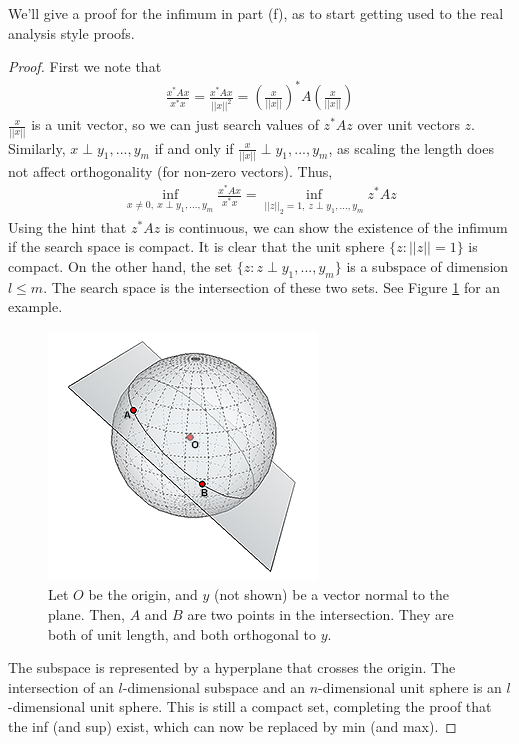 \documentclass[11pt]{article}
\theoremstyle{plain}
\theoremstyle{definition}
\theoremstyle{remark}
\begin{document}
We'll give a proof for the infimum in part (f), as to start getting used to the real analysis style proofs. 
\begin{proof}
First we note that
\begin{align*}
    \frac{x^* A x}{x^*x} = \frac{x^* A x}{||x||^2} = \left(\frac{x}{||x||}\right)^* A \left(\frac{x}{||x||}\right)
\end{align*}
$\frac{x}{||x||}$ is a unit vector, so we can just search values of $z^* A z$ over unit vectors $z$. Similarly, $x \perp y_{1}, ..., y_{m}$ if and only if $\frac{x}{||x||} \perp y_{1}, ..., y_{m}$, as scaling the length does not affect orthogonality (for non-zero vectors). Thus,
\begin{align*}
    \inf_{x \neq 0, \ x \perp y_{1}, ..., y_{m}} \frac{x^* A x}{x^*x} = \inf_{||z||_2 = 1, \ z \perp y_{1}, ..., y_{m}} z^* A z
\end{align*}
Using the hint that $z^* A z$ is continuous, we can show the existence of the infimum if the search space is compact. It is clear that the unit sphere $\{z : ||z|| = 1\}$ is compact. On the other hand, the set $\{z: z \perp y_{1}, ..., y_{m}\}$ is a subspace of dimension $l \leq m$. The search space is the intersection of these two sets. See Figure \ref{fig:sphere} for an example.
\begin{figure}[ht!]
    \centering
    \includegraphics[width=0.7\linewidth]{figures/sphere-and-plane.png}
    \caption{Let $O$ be the origin, and $y$ 
    (not shown) be a vector normal to the plane. Then, $A$ and $B$ are two points in the intersection. They are both of unit length, and both orthogonal to $y$.}
    \label{fig:sphere}
\end{figure}
The subspace is represented by a hyperplane that crosses the origin. The intersection of an $l$-dimensional subspace and an $n$-dimensional unit sphere is an $l$-dimensional unit sphere. This is still a compact set, completing the proof that the inf (and sup) exist, which can now be replaced by min (and max).
\end{proof}
\end{document}
